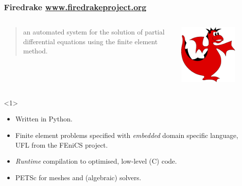 \documentclass[presentation]{beamer}
\begin{document}
\begin{frame}
  \frametitle{Firedrake \url{www.firedrakeproject.org}}

  \begin{columns}
    \begin{column}{0.8\textwidth}
      \begin{quote}
        {\normalfont [\ldots]} an automated system for the solution of
        partial differential equations using the finite element
        method.
      \end{quote}
    \end{column}
    \begin{column}{0.2\textwidth}
      \includegraphics[width=0.8\textwidth]{firedrake-small}
    \end{column}
  \end{columns}
  \begin{overlayarea}{\textwidth}{0.8\textheight}
    \begin{onlyenv}<1>
      \begin{itemize}
      \item Written in Python.
      \item Finite element problems specified with \emph{embedded}
        domain specific language, UFL \parencite{Alnaes:2014} from the
        FEniCS project.
      \item \emph{Runtime} compilation to optimised, low-level (C)
        code.
      \item PETSc for meshes and (algebraic) solvers.
      \end{itemize}


\end{onlyenv}
\end{overlayarea}
\end{frame}
\end{document}
